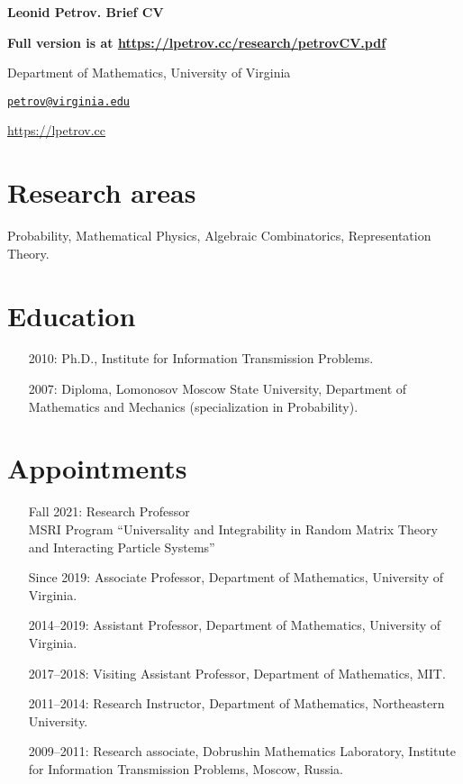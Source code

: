 \documentclass[letterpaper,11pt]{article}
\def\name{Leonid Petrov}
\begin{document}
\centerline{\huge \bf \name . Brief CV}
\bigskip

\textbf{Full version is at \url{https://lpetrov.cc/research/petrovCV.pdf}}

\noindent\hrulefill

\vspace{0.25in}

Department of Mathematics, University of Virginia

\href{mailto:petrov@virginia.edu}{\tt petrov@virginia.edu}

\url{https://lpetrov.cc}

\section*{Research areas}

Probability, Mathematical Physics, Algebraic Combinatorics, Representation
Theory.

\section*{Education}

\begin{itemize}
	\item [2010:]
		Ph.D., 
		Institute for Information Transmission Problems.

	\item [2007:]
		Diploma,
		Lomonosov Moscow State University,
		Department of Mathematics and Mechanics (specialization in Probability). 
\end{itemize}

\section*{Appointments}

\begin{itemize}
	\item [Fall 2021:]
		  Research Professor
		  \\
		  MSRI Program ``Universality and Integrability in Random Matrix Theory and Interacting Particle Systems''
	\item
	      [Since 2019:]
	      Associate Professor, Department of Mathematics, University
		  of Virginia.
	\item
	      [2014--2019:]
				Assistant Professor, Department of Mathematics, University
				of Virginia.
	\item
	      [2017--2018:]
				Visiting Assistant Professor, Department of Mathematics, MIT.
	\item
	      [2011--2014:]
				Research Instructor, Department of Mathematics, Northeastern
				University.
	\item
	      [2009--2011:]
				Research associate, Dobrushin Mathematics Laboratory,
	      Institute for Information Transmission Problems, Moscow, Russia.
\end{itemize}
\end{document}
